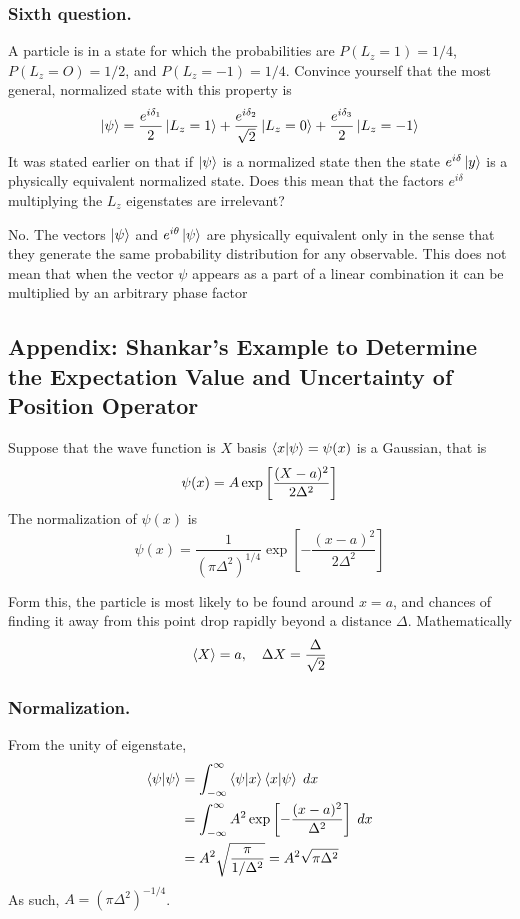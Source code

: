 \documentclass[../../../main.tex]{subfiles}
\begin{document}
\subsubsection{Sixth question.}
A particle is in a state for which the probabilities are $P(L_z=1)=1/4$, $P(L_z=O)=1/2$, and $P(L_z =-1)= 1 /4$.
Convince yourself that the most general, normalized state with this property is
\begin{equation*}
    \ket{\psi}=\frac{e^{i\delta_1 }}{2 }\ket{L_z=1}+\frac{e^{i \delta_2 }}{\sqrt{2 }}\ket{L_z=0}+\frac{e^{i \delta_3 }}{2}\ket{L_z=-1}
\end{equation*}
It was stated earlier on that if $\ket{\psi}$ is a normalized state then the state $e^{i\delta}\ket{y}$ is a physically equivalent normalized state.
Does this mean that the factors $e^{i\delta}$ multiplying the $L_z$ eigenstates are irrelevant?

No.
The vectors $\ket{\psi}$ and $e^{i\theta}\ket{\psi}$ are physically equivalent only in the sense that they generate the same probability distribution for any observable.
This does not mean that when the vector $\psi$ appears as a part of a linear combination it can be multiplied by an arbitrary phase factor

\subsection{Appendix: Shankar's Example to Determine the Expectation Value and Uncertainty of Position Operator}
Suppose that the wave function is $X$ basis $\braket{x|\psi}=\psi(x)$ is a Gaussian, that is
\begin{equation*}
    \psi(x)=A \exp \left[ \-\frac{(X-a)^2 }{2\Delta^2} \right] 
\end{equation*}
The normalization of $\psi(x )$ is 
\begin{equation*}
    \psi(x)=\frac{1 }{(\pi\Delta^2)^{1/4}}\exp \left[ -\frac{(x-a )^2}{2\Delta^2} \right] 
\end{equation*}

Form this, the particle is most likely to be found around $x =a$, and chances of finding it away from this point drop rapidly beyond a distance $\Delta$. 
Mathematically
\begin{equation*}
    \braket{X}=a,\quad\Delta X=\frac{\Delta}{\sqrt{2}}
\end{equation*}

\subsubsection{Normalization.}
From the  unity of eigenstate,
\begin{align*}
    \braket{\psi|\psi}&= \int_{-\infty}^{\infty} \braket{\psi|x}\braket{x|\psi}\;dx\\
    &= \int_{-\infty}^{\infty} A^2\exp \left[ -\frac{(x-a)^2}{\Delta^2} \right] \;dx\\
    &= A^2 \sqrt{\frac{\pi }{1/\Delta^2}}=A^2 \sqrt{\pi \Delta^2}
\end{align*}
As such, $A=(\pi\Delta^2)^{-1/4}$.
\end{document}
